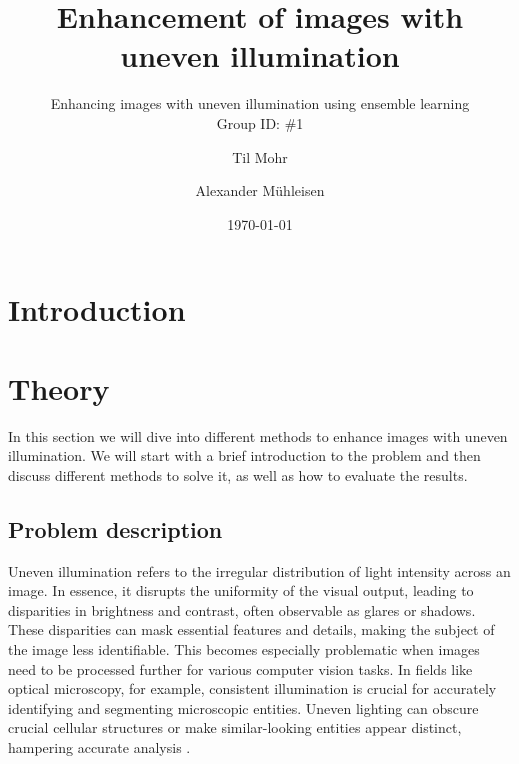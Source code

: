 \documentclass[sigconf]{acmart}
\begin{document}
\title{Enhancement of images with uneven illumination}
\subtitle{Enhancing images with uneven illumination using ensemble learning\\Group ID: \#1}

\author{Til Mohr}
\affiliation{}

\author{Alexander Mühleisen}
\affiliation{}

\date{\today}



\begin{abstract}

\end{abstract}


\renewcommand\footnotetextcopyrightpermission[1]{}
\pagestyle{plain}

\maketitle


\section{Introduction}\label{sec:intro}

\section{Theory}\label{sec:theory}
In this section we will dive into different methods to enhance images with uneven illumination. We will start with a brief introduction to the problem and then discuss different methods to solve it, as well as how to evaluate the results.

\subsection{Problem description}\label{sec:problem}
Uneven illumination refers to the irregular distribution of light intensity across an image. In essence, it disrupts the uniformity of the visual output, leading to disparities in brightness and contrast, often observable as glares or shadows. These disparities can mask essential features and details, making the subject of the image less identifiable. This becomes especially problematic when images need to be processed further for various computer vision tasks. In fields like optical microscopy, for example, consistent illumination is crucial for accurately identifying and segmenting microscopic entities. Uneven lighting can obscure crucial cellular structures or make similar-looking entities appear distinct, hampering accurate analysis \cite{dey2019uneven}.
\end{document}
